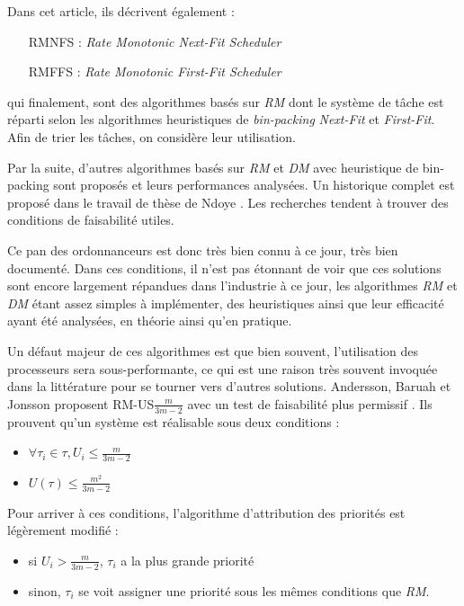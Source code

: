 \documentclass[11pt,a4paper,oneside]{report}
\begin{document}
	Dans cet article, ils décrivent également :\medskip
	\begin{itemize}
		\item[RMNFS] : \textit{Rate Monotonic Next-Fit Scheduler}
		\item[RMFFS] : \textit{Rate Monotonic First-Fit Scheduler}
	\end{itemize}
	\vspace{1em}
	qui finalement, sont des algorithmes basés sur \textit{RM} dont le système de tâche est 
	réparti selon les algorithmes heuristiques de \textit{bin-packing} \textit{Next-Fit} et \textit{First-Fit}. 
	Afin de trier les tâches, on considère leur utilisation.
	
	
	Par la suite, d'autres algorithmes basés sur \textit{RM} et \textit{DM} avec 
	heuristique de bin-packing sont proposés et leurs performances analysées. 
	Un historique complet est proposé dans le travail de thèse de Ndoye \cite{ndoye_ordonnancement_2014}. 
	Les recherches tendent à trouver des conditions de faisabilité utiles.\medskip
	
	Ce pan des ordonnanceurs est donc très bien connu à ce jour, très bien documenté. 
	Dans ces conditions, il n'est pas étonnant de voir que ces solutions sont encore largement 
	répandues dans l'industrie à ce jour, les algorithmes \textit{RM} et \textit{DM} 
	étant assez simples à implémenter, des heuristiques ainsi que leur efficacité ayant été analysées, en théorie ainsi qu'en pratique.\medskip
	
	Un défaut majeur de ces algorithmes est que bien souvent, l'utilisation des processeurs sera 
	sous-performante, ce qui est une raison très souvent invoquée dans la littérature pour se 
	tourner vers d'autres solutions. 
	Andersson, Baruah et Jonsson proposent RM-US$\frac{m}{3m-2}$ avec un test 
	de faisabilité plus permissif \cite{andersson_static-priority_2001}. Ils prouvent 
	qu'un système est réalisable sous deux conditions :\medskip
	\begin{itemize}
		\item $\forall \tau_i \in \tau, U_i \leq \frac{m}{3m-2}$
		\item $U(\tau) \leq \frac{m^2}{3m-2}$ 
	\end{itemize}
	\vspace{1em}
	Pour arriver à ces conditions, l'algorithme d'attribution des priorités est légèrement modifié : \medskip
	\begin{itemize}
		\item si $U_i > \frac{m}{3m-2}$, $\tau_i$ a la plus grande priorité
		\item sinon, $\tau_i$ se voit assigner une priorité sous les mêmes conditions que \textit{RM}.
	\end{itemize}
	
\end{document}
